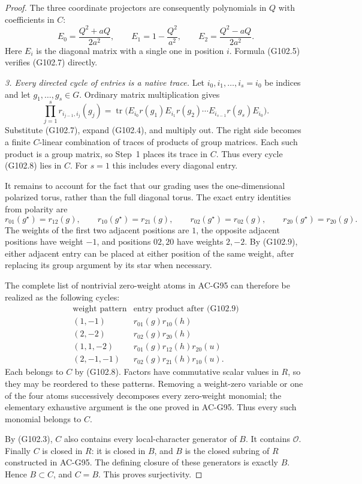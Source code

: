 \begin{proof}
The three coordinate projectors are consequently polynomials
in $Q$ with coefficients in $C$:
\[
 E_0=\frac{Q^2+aQ}{2a^2},\qquad
 E_1=1-\frac{Q^2}{a^2},\qquad
 E_2=\frac{Q^2-aQ}{2a^2}.
\tag{G102.7}
\]
Here $E_i$ is the diagonal matrix with a single one in
position $i$.  Formula (G102.5) verifies (G102.7) directly.

\emph{3. Every directed cycle of entries is a native trace.}
Let $i_0,i_1,\ldots,i_s=i_0$ be indices and let
$g_1,\ldots,g_s\in G$.  Ordinary matrix multiplication gives
\[
 \prod_{j=1}^{s}r_{i_{j-1},i_j}(g_j)
 =\operatorname{tr}
   \bigl(E_{i_0}r(g_1)E_{i_1}r(g_2)\cdots
                         E_{i_{s-1}}r(g_s)E_{i_0}\bigr).
\tag{G102.8}
\]
Substitute (G102.7), expand (G102.4), and multiply out.
The right side becomes a finite $C$-linear combination of
traces of products of group matrices.  Each such product
is a group matrix, so Step~1 places its trace in $C$.
Thus every cycle (G102.8) lies in $C$.
For $s=1$ this includes every diagonal entry.

It remains to account for the fact that our grading uses
the one-dimensional polarized torus, rather than the full
diagonal torus.  The exact entry identities from polarity are
\[
 r_{01}(g^\star)=r_{12}(g),\qquad
 r_{10}(g^\star)=r_{21}(g),\qquad
 r_{02}(g^\star)=r_{02}(g),\qquad
 r_{20}(g^\star)=r_{20}(g).
\tag{G102.9}
\]
The weights of the first two adjacent positions are $1$,
the opposite adjacent positions have weight $-1$, and
positions $02,20$ have weights $2,-2$.
By (G102.9), either adjacent entry can be placed at either
position of the same weight, after replacing its group
argument by its star when necessary.

The complete list of nontrivial zero-weight atoms in
AC-G95 can therefore be realized as the following cycles:
\[
\begin{array}{c|c}
 \text{weight pattern}&\text{entry product after (G102.9)}\\ \hline
 (1,-1)&r_{01}(g)r_{10}(h)\\
 (2,-2)&r_{02}(g)r_{20}(h)\\
 (1,1,-2)&r_{01}(g)r_{12}(h)r_{20}(u)\\
 (2,-1,-1)&r_{02}(g)r_{21}(h)r_{10}(u).
\end{array}
\tag{G102.10}
\]
Each belongs to $C$ by (G102.8).  Factors have commutative
scalar values in $R$, so they may be reordered to these
patterns.  Removing a weight-zero variable or one of the
four atoms successively decomposes every zero-weight
monomial; the elementary exhaustive argument is the one
proved in AC-G95.  Thus every such monomial belongs to $C$.

By (G102.3), $C$ also contains every local-character generator
of $B$.  It contains $\mathcal O$.  Finally $C$ is closed in
$R$: it is closed in $B$, and $B$ is the closed subring of
$R$ constructed in AC-G95.  The defining closure of these
generators is exactly $B$.  Hence $B\subset C$, and $C=B$.
This proves surjectivity.
\end{proof}

